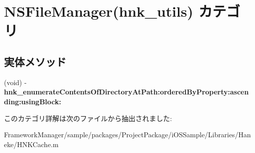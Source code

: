 \hypertarget{category_n_s_file_manager_07hnk__utils_08}{}\section{N\+S\+File\+Manager(hnk\+\_\+utils) カテゴリ}
\label{category_n_s_file_manager_07hnk__utils_08}
\subsection*{実体メソッド}
\begin{DoxyCompactItemize}
\item 
\hypertarget{category_n_s_file_manager_07hnk__utils_08_a6cdd8a9f8304edbc418bbb0be0c6ebcd}{}(void) -\/ {\bfseries hnk\+\_\+enumerate\+Contents\+Of\+Directory\+At\+Path\+:ordered\+By\+Property\+:ascending\+:using\+Block\+:}\label{category_n_s_file_manager_07hnk__utils_08_a6cdd8a9f8304edbc418bbb0be0c6ebcd}

\end{DoxyCompactItemize}


このカテゴリ詳解は次のファイルから抽出されました\+:\begin{DoxyCompactItemize}
\item 
Framework\+Manager/sample/packages/\+Project\+Package/i\+O\+S\+Sample/\+Libraries/\+Haneke/H\+N\+K\+Cache.\+m\end{DoxyCompactItemize}
